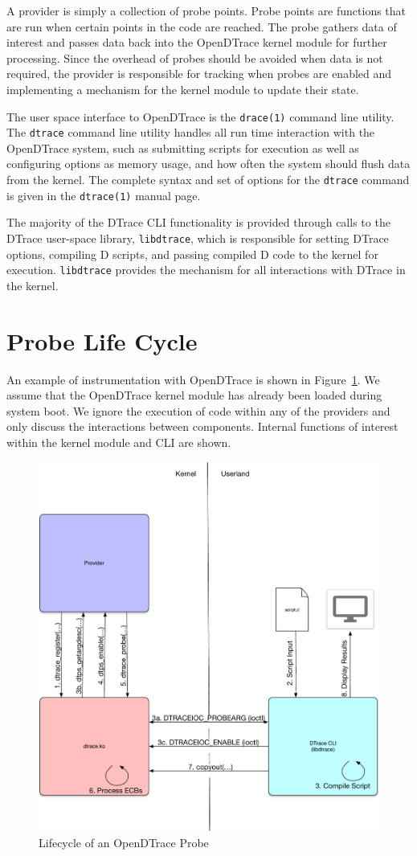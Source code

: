 A provider is simply a collection of probe points. Probe points are
functions that are run when certain points in the code are
reached. The probe gathers data of interest and passes data back into
the OpenDTrace kernel module for further processing. Since the
overhead of probes should be avoided when data is not required, the
provider is responsible for tracking when probes are enabled and
implementing a mechanism for the kernel module to update their state.

The user space interface to OpenDTrace is the \texttt{drace(1)}
command line utility. The \texttt{dtrace} command line utility handles
all run time interaction with the OpenDTrace system, such as
submitting scripts for execution as well as configuring options as
memory usage, and how often the system should flush data from the
kernel.  The complete syntax and set of options for the
\texttt{dtrace} command is given in the \texttt{dtrace(1)} manual
page.

The majority of the DTrace CLI functionality is provided through calls
to the DTrace user-space library, \texttt{libdtrace}, which is
responsible for setting DTrace options, compiling D scripts, and
passing compiled D code to the kernel for
execution. \texttt{libdtrace} provides the mechanism for all
interactions with DTrace in the kernel.

\section{Probe Life Cycle}
\label{sec:lifecycle}

An example of instrumentation with OpenDTrace is shown in
Figure~\ref{fig:lifecycle}. We assume that the OpenDTrace kernel
module has already been loaded during system boot. We ignore the
execution of code within any of the providers and only discuss the
interactions between components. Internal functions of interest within
the kernel module and CLI are shown.

\begin{figure}[htpb]
	\centering
	\includegraphics[width=0.8\linewidth]{dtrace-lifecycle.pdf}
	\caption{Lifecycle of an OpenDTrace Probe}
	\label{fig:lifecycle}
\end{figure}

